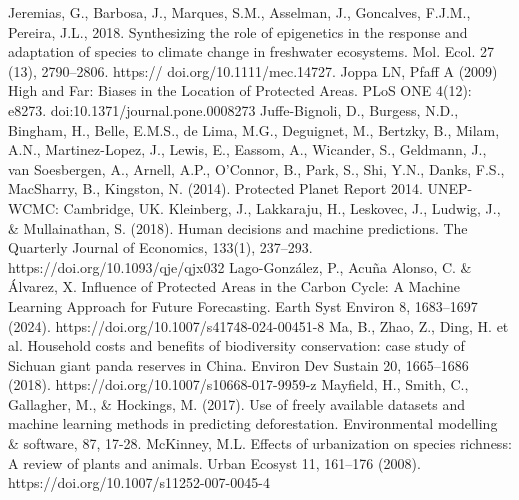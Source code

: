 \documentclass[12pt]{article}
\theoremstyle{break} %
\begin{document}
\newline \newline
Jeremias, G., Barbosa, J., Marques, S.M., Asselman, J., Goncalves, F.J.M., Pereira, J.L., 2018. Synthesizing the role of epigenetics in the response and adaptation of species to climate change in freshwater ecosystems. Mol. Ecol. 27 (13), 2790–2806. https:// doi.org/10.1111/mec.14727. 
\newline \newline
Joppa LN, Pfaff A (2009) High and Far: Biases in the Location of Protected Areas. PLoS ONE 4(12): e8273. doi:10.1371/journal.pone.0008273
\newline \newline
Juffe-Bignoli, D., Burgess, N.D., Bingham, H., Belle, E.M.S., de Lima, M.G., Deguignet, M., Bertzky, B., Milam, A.N., Martinez-Lopez, J., Lewis, E., Eassom, A., Wicander, S., Geldmann, J., van Soesbergen, A., Arnell, A.P., O’Connor, B., Park, S., Shi, Y.N., Danks, F.S., MacSharry, B., Kingston, N. (2014). Protected Planet Report 2014. UNEP-WCMC: Cambridge, UK. 
\newline \newline
Kleinberg, J., Lakkaraju, H., Leskovec, J., Ludwig, J., \& Mullainathan, S. (2018). Human decisions and machine predictions. The Quarterly Journal of Economics, 133(1), 237–293. https://doi.org/10.1093/qje/qjx032
\newline \newline
Lago-González, P., Acuña Alonso, C. \& Álvarez, X. Influence of Protected Areas in the Carbon Cycle: A Machine Learning Approach for Future Forecasting. Earth Syst Environ 8, 1683–1697 (2024). https://doi.org/10.1007/s41748-024-00451-8
\newline \newline
Ma, B., Zhao, Z., Ding, H. et al. Household costs and benefits of biodiversity conservation: case study of Sichuan giant panda reserves in China. Environ Dev Sustain 20, 1665–1686 (2018). https://doi.org/10.1007/s10668-017-9959-z
\newline \newline
Mayfield, H., Smith, C., Gallagher, M., \& Hockings, M. (2017). Use of freely available datasets and machine learning methods in predicting deforestation. Environmental modelling \& software, 87, 17-28.
\newline \newline
McKinney, M.L. Effects of urbanization on species richness: A review of plants and animals. Urban Ecosyst 11, 161–176 (2008). https://doi.org/10.1007/s11252-007-0045-4
\end{document}
